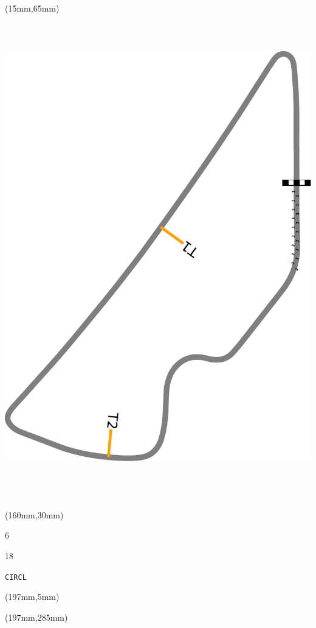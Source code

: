 \begin{textblock*}{185mm}(15mm,65mm)%
\centering
\mbox{\includegraphics[width=185mm,height=210mm,keepaspectratio]{PT/CIRCL.pdf}}
\end{textblock*}
\begin{textblock*}{40mm}(160mm,30mm)%
\Large
\par{} 
\par6 
\par18 
\par\hfill\tiny\tt CIRCL\\
\end{textblock*}
\begin{textblock*}{20mm}(197mm,5mm)%
\fbox{\thepage}
\label{CIRCL}
\end{textblock*}
\begin{textblock*}{20mm}(197mm,285mm)%
\fbox{\thepage}
\end{textblock*}

